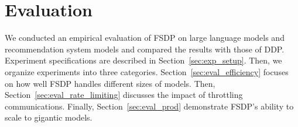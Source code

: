 \section{Evaluation}\label{sec:evaluation}

We conducted an empirical evaluation of FSDP on large language models and recommendation system models and compared the results with those of DDP. Experiment specifications are described in Section~\ref{sec:exp_setup}. Then, we organize experiments into three categories. Section~\ref{sec:eval_efficiency} focuses on how well FSDP handles different sizes of models. Then, Section~\ref{sec:eval_rate_limiting} discusses the impact of throttling communications. Finally, Section~\ref{sec:eval_prod} demonstrate FSDP's ability to scale to gigantic models. 




